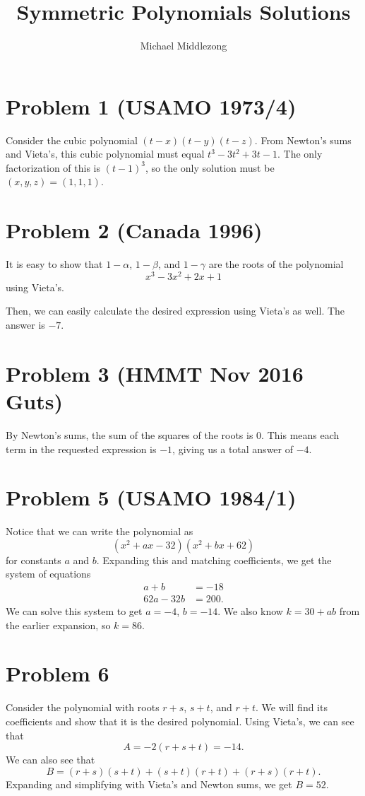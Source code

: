 \documentclass{scrartcl}
\title{Symmetric Polynomials Solutions}
\author{Michael Middlezong}
\begin{document}
\maketitle
\section*{Problem 1 (USAMO 1973/4)}
Consider the cubic polynomial $(t - x)(t - y)(t - z)$. From Newton's sums and Vieta's, this cubic polynomial must equal $t^3 - 3t^2 + 3t - 1$. The only factorization of this is $(t - 1)^3$, so the only solution must be $(x,y,z)=(1,1,1)$.

\section*{Problem 2 (Canada 1996)}
It is easy to show that $1-\alpha$, $1-\beta$, and $1-\gamma$ are the roots of the polynomial
\[
    x^3 - 3x^2 + 2x + 1
\]
using Vieta's.

Then, we can easily calculate the desired expression using Vieta's as well. The answer is $-7$.
\section*{Problem 3 (HMMT Nov 2016 Guts)}
By Newton's sums, the sum of the squares of the roots is $0$. This means each term in the requested expression is $-1$, giving us a total answer of $-4$.
\section*{Problem 5 (USAMO 1984/1)}
Notice that we can write the polynomial as
\[
    (x^2 + ax - 32)(x^2 + bx + 62)
\]
for constants $a$ and $b$. Expanding this and matching coefficients, we get the system of equations
\begin{align*}
    a + b &= -18 \\
    62a - 32b &= 200.
\end{align*}
We can solve this system to get $a = -4$, $b = -14$. We also know $k = 30 + ab$ from the earlier expansion, so $k = 86$.

\section*{Problem 6}
Consider the polynomial with roots $r + s$, $s + t$, and $r + t$. We will find its coefficients and show that it is the desired polynomial.
Using Vieta's, we can see that
\[
    A = -2(r + s + t) = -14.
\]
We can also see that
\[
    B = (r + s)(s + t) + (s + t)(r + t) + (r + s)(r + t).
\]
Expanding and simplifying with Vieta's and Newton sums, we get $B = 52$.
\end{document}
